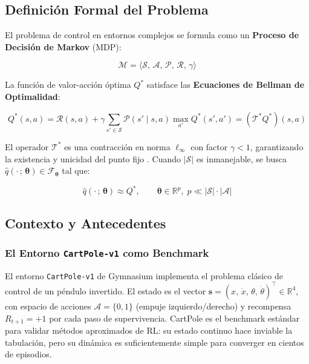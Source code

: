 \subsection{Definición Formal del Problema}

El problema de control en entornos complejos se formula como un \textbf{Proceso de Decisión de Markov} (MDP):

\begin{equation}
  \mathcal{M} = \langle \mathcal{S},\, \mathcal{A},\, \mathcal{P},\, \mathcal{R},\, \gamma \rangle
\end{equation}

La función de valor-acción óptima $Q^*$ satisface las \textbf{Ecuaciones de Bellman de Optimalidad}:

\begin{equation}
  Q^*(s,a) = \mathcal{R}(s,a) + \gamma \sum_{s' \in \mathcal{S}} \mathcal{P}(s'\mid s,a) \max_{a'} Q^*(s',a')
  = (\mathcal{T}^* Q^*)(s,a)
\end{equation}

El operador $\mathcal{T}^*$ es una contracción en norma $\ell_\infty$ con factor $\gamma < 1$, garantizando la existencia y unicidad del punto fijo \cite{Bellman1957}. Cuando $|\mathcal{S}|$ es inmanejable, se busca $\hat{q}(\cdot\,;\,\boldsymbol{\theta}) \in \mathcal{F}_{\boldsymbol{\theta}}$ tal que:

\begin{equation}
  \hat{q}(\cdot\,;\,\boldsymbol{\theta}) \approx Q^*, \qquad \boldsymbol{\theta} \in \mathbb{R}^p,\; p \ll |\mathcal{S}| \cdot |\mathcal{A}|
\end{equation}

\subsection{Contexto y Antecedentes}

\subsubsection{El Entorno \texttt{CartPole-v1} como Benchmark}

El entorno \texttt{CartPole-v1} de Gymnasium \cite{Towers2023} implementa el problema clásico de control de un péndulo invertido. El estado es el vector $\mathbf{s} = (x,\,\dot{x},\,\theta,\,\dot{\theta})^\top \in \mathbb{R}^4$, con espacio de acciones $\mathcal{A} = \{0, 1\}$ (empuje izquierdo/derecho) y recompensa $R_{t+1} = +1$ por cada paso de supervivencia. CartPole es el benchmark estándar para validar métodos aproximados de RL: su estado continuo hace inviable la tabulación, pero su dinámica es suficientemente simple para converger en cientos de episodios.

